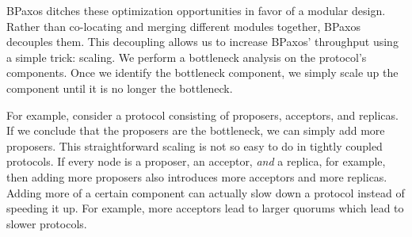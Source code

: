 BPaxos ditches these optimization opportunities in favor of a modular design.
Rather than co-locating and merging different modules together, BPaxos
decouples them. This decoupling allows us to increase BPaxos' throughput using
a simple trick: scaling. We perform a bottleneck analysis on the protocol's
components. Once we identify the bottleneck component, we simply scale up the
component until it is no longer the bottleneck.

%

For example, consider a protocol consisting of proposers, acceptors, and
replicas. If we conclude that the proposers are the bottleneck, we can simply
add more proposers. This straightforward scaling is not so easy to do in
tightly coupled protocols. If every node is a proposer, an acceptor, \emph{and}
a replica, for example, then adding more proposers also introduces more
acceptors and more replicas. Adding more of a certain component can actually
slow down a protocol instead of speeding it up. For example, more acceptors
lead to larger quorums which lead to slower protocols.


